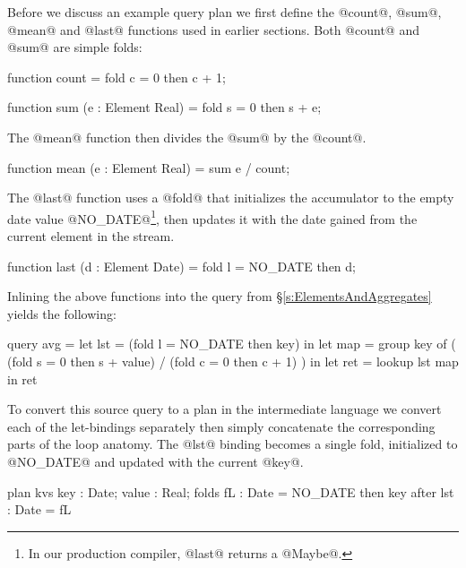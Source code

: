 Before we discuss an example query plan we first define the @count@, @sum@, @mean@ and @last@ functions used in earlier sections. Both @count@ and @sum@ are simple folds:
\begin{code}
    function count
     = fold c = 0 then c + 1;

    function sum (e : Element Real)
     = fold s = 0 then s + e;
\end{code}
The @mean@ function then divides the @sum@ by the @count@.
\begin{code}
    function mean (e : Element Real)
     = sum e / count;
\end{code}

The @last@ function uses a @fold@ that initializes the accumulator to the empty date value @NO_DATE@\footnote{In our production compiler, @last@ returns a @Maybe@.}, then updates it with the date gained from the current element in the stream.
\begin{code}
    function last (d : Element Date)
     = fold l = NO_DATE then d;
\end{code}


Inlining the above functions into the query from \S\ref{s:ElementsAndAggregates} yields the following:
\begin{code}
  query avg
   =    let lst = (fold l = NO_DATE then key)
     in let map = group key of
                  ( (fold s = 0 then s + value)
                  / (fold c = 0 then c + 1) )
     in let ret = lookup lst map
     in     ret
\end{code}

To convert this source query to a plan in the intermediate language we convert each of the let-bindings separately then simply concatenate the corresponding parts of the loop anatomy. The @lst@ binding becomes a single fold, initialized to @NO_DATE@ and updated with the current @key@.
\begin{code}
  plan kvs { key : Date; value : Real;      }
  folds    { fL  : Date = NO_DATE then key  }
  after    { lst : Date = fL                }
\end{code}

